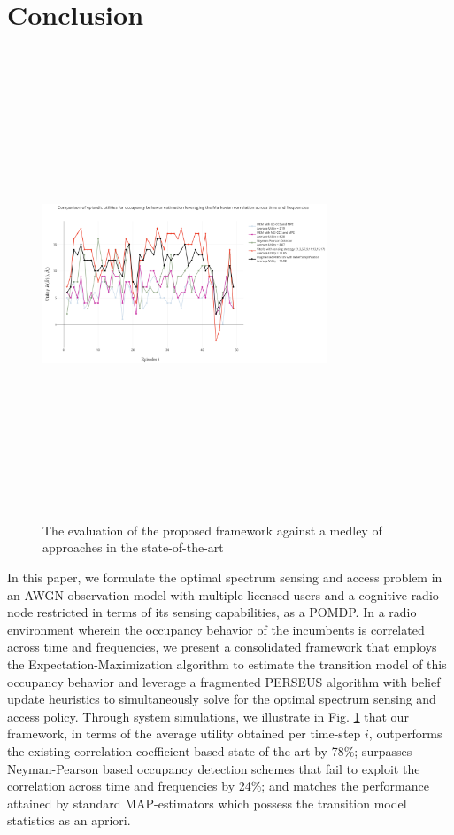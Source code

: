 \documentclass[10pt,twocolumn]{IEEEtran}
\begin{document}
\section{Conclusion}\label{V}
\begin{figure}
    \centering
    \includegraphics[width=8.5cm,height=14cm,keepaspectratio]{ComparisonWithSoA.png}
    \caption{The evaluation of the proposed framework against a medley of approaches in the state-of-the-art}
    \label{fig:7}
\end{figure}
In this paper, we formulate the optimal spectrum sensing and access problem in an AWGN observation model with multiple licensed users and a cognitive radio node restricted in terms of its sensing capabilities, as a POMDP. In a radio environment wherein the occupancy behavior of the incumbents is correlated across time and frequencies, we present a consolidated framework that employs the Expectation-Maximization algorithm to estimate the transition model of this occupancy behavior and leverage a fragmented PERSEUS algorithm with belief update heuristics to simultaneously solve for the optimal spectrum sensing and access policy. Through system simulations, we illustrate in Fig. \ref{fig:7} that our framework, in terms of the average utility obtained per time-step $i$, outperforms the existing correlation-coefficient based state-of-the-art by 78\%; surpasses Neyman-Pearson based occupancy detection schemes that fail to exploit the correlation across time and frequencies by 24\%; and matches the performance attained by standard MAP-estimators which possess the transition model statistics as an apriori.


\end{document}
